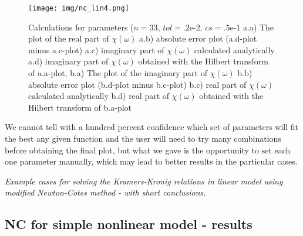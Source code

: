 \documentclass[12pt,twoside,a4paper]{article}
\numberwithin{equation}{subsection}
\numberwithin{figure}{subsection}
\begin{document}
\begin{figure}
  \texttt{[image: img/nc\_lin4.png]}
  \caption{Calculations for parameters ($n=33, \,tol=\mbox{.2e-2}, \,cs=\mbox{.5e-1}$
    a.a) The plot of the real part of $\chi (\omega )$
    a.b) absolute error plot (a.d-plot minus a.c-plot) 
    a.c) imaginary part of $\chi (\omega )$ calculated analytically 
    a.d) imaginary part of $\chi (\omega )$ obtained with the Hilbert transform of a.a-plot,
    b.a) The plot of the imaginary part of $\chi (\omega )$
    b.b) absolute error plot (b.d-plot minus b.c-plot) 
    b.c) real part of $\chi (\omega )$ calculated analytically 
    b.d) real part of $\chi (\omega )$ obtained with the Hilbert transform of b.a-plot
    \label{nc_lin4} 
    }
\end{figure}

We cannot tell with a hundred percent confidence which set of parameters will fit the best any given function and the user will
need to try many combinations before obtaining the final plot, but what we gave is the opportunity to set each one parameter manually,
which may lead to better results in the particular cases.

\textit{Example cases for solving the Kramers-Kronig relations in linear model using modified Newton-Cotes method - with short
conclusions.}

\subsection{NC for simple nonlinear model - results} \label{chap:nc_nlo}
\end{document}

